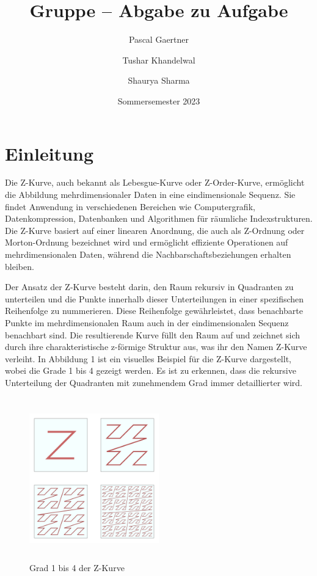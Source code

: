\documentclass[course=erap]{aspdoc}
\author{Pascal Gaertner\and Tushar Khandelwal\and Shaurya Sharma}
\date{Sommersemester 2023}
\title{Gruppe \theGroup{} -- Abgabe zu Aufgabe \theNumber}
\begin{document}
\maketitle

\section{Einleitung}

\setlength{\parskip}{1em}
\noindent Die Z-Kurve, auch bekannt als Lebesgue-Kurve oder Z-Order-Kurve, ermöglicht die Abbildung mehrdimensionaler Daten in eine eindimensionale Sequenz. Sie findet Anwendung in verschiedenen Bereichen wie Computergrafik, Datenkompression, Datenbanken und Algorithmen für räumliche Indexstrukturen. Die Z-Kurve basiert auf einer linearen Anordnung, die auch als Z-Ordnung oder Morton-Ordnung bezeichnet wird und ermöglicht effiziente Operationen auf mehrdimensionalen Daten, während die Nachbarschaftsbeziehungen erhalten bleiben.
\setlength{\parskip}{1em}

\noindent Der Ansatz der Z-Kurve besteht darin, den Raum rekursiv in Quadranten zu unterteilen und die Punkte innerhalb dieser Unterteilungen in einer spezifischen Reihenfolge zu nummerieren. Diese Reihenfolge gewährleistet, dass benachbarte Punkte im mehrdimensionalen Raum auch in der eindimensionalen Sequenz benachbart sind. Die resultierende Kurve füllt den Raum auf und zeichnet sich durch ihre charakteristische z-förmige Struktur aus, was ihr den Namen Z-Kurve verleiht. In Abbildung 1 ist ein visuelles Beispiel für die Z-Kurve dargestellt, wobei die Grade 1 bis 4 gezeigt werden. Es ist zu erkennen, dass die rekursive Unterteilung der Quadranten mit zunehmendem Grad immer detaillierter wird.
\setlength{\parskip}{1em}

\begin{figure}[H]
        \centering
        \includegraphics[width=0.5\textwidth, height=7cm]{Z-Curve Degree 1 to 4.png}
        \caption{Grad 1 bis 4 der Z-Kurve}
        \label{fig:Z-Curve Degree 1 to 4}
    \end{figure}
\end{document}
